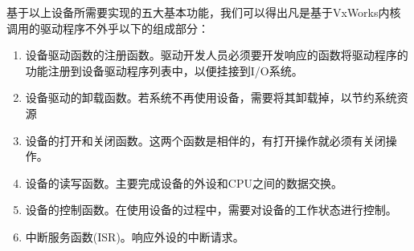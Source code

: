 基于以上设备所需要实现的五大基本功能，我们可以得出凡是基于VxWorks内核调用的驱动程序不外乎以下的组成部分：

\begin{enumerate}
\item 设备驱动函数的注册函数。驱动开发人员必须要开发响应的函数将驱动程序的功能注册到设备驱动程序列表中，以便挂接到I/O系统。

\item 设备驱动的卸载函数。若系统不再使用设备，需要将其卸载掉，以节约系统资源

\item 设备的打开和关闭函数。这两个函数是相伴的，有打开操作就必须有关闭操作。

\item 设备的读写函数。主要完成设备的外设和CPU之间的数据交换。

\item 设备的控制函数。在使用设备的过程中，需要对设备的工作状态进行控制。

\item 中断服务函数(ISR)。响应外设的中断请求。
\end{enumerate}\\




